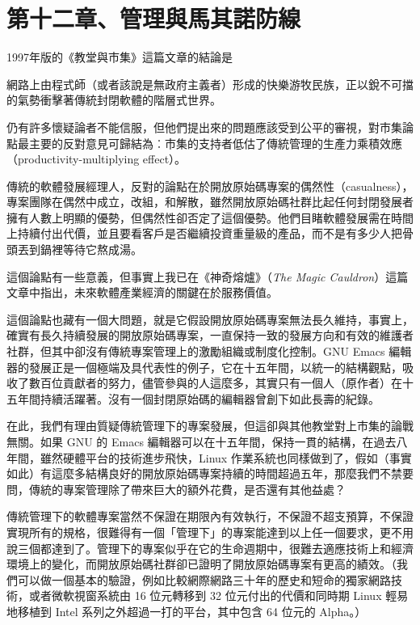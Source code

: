 \documentclass[10pt, b5paper]{book}
\makeatletter
\newcommand*{\shifttext}[2]{%
  \settowidth{\@tempdima}{#2}%
  \makebox[\@tempdima]{\hspace*{#1}#2}%
}
\makeatother
\begin{document}
\newpage
\section{第十二章、管理與馬其諾防線}

1997年版的《教堂與市集》這篇文章的結論是 \shifttext{1pt}{---}\shifttext{-1pt}{---}
網路上由程式師（或者該說是無政府主義者）形成的快樂游牧民族，正以銳不可擋的氣勢衝擊著傳統封閉軟體的階層式世界。

仍有許多懷疑論者不能信服，但他們提出來的問題應該受到公平的審視，對市集論點最主要的反對意見可歸結為︰市集的支持者低估了傳統管理的生產力乘積效應（productivity-multiplying
effect）。

傳統的軟體發展經理人，反對的論點在於開放原始碼專案的偶然性（casualness），專案團隊在偶然中成立，改組，和解散，雖然開放原始碼社群比起任何封閉發展者擁有人數上明顯的優勢，但偶然性卻否定了這個優勢。他們目睹軟體發展需在時間上持續付出代價，並且要看客戶是否繼續投資重量級的產品，而不是有多少人把骨頭丟到鍋裡等待它熬成湯。

這個論點有一些意義，但事實上我已在《神奇熔爐》（\emph{The Magic
Cauldron}）這篇文章中指出，未來軟體產業經濟的關鍵在於服務價值。

這個論點也藏有一個大問題，就是它假設開放原始碼專案無法長久維持，事實上，確實有長久持續發展的開放原始碼專案，一直保持一致的發展方向和有效的維護者社群，但其中卻沒有傳統專案管理上的激勵組織或制度化控制。GNU
Emacs
編輯器的發展正是一個極端及具代表性的例子，它在十五年間，以統一的結構觀點，吸收了數百位貢獻者的努力，儘管參與的人這麼多，其實只有一個人（原作者）在十五年間持續活躍著。沒有一個封閉原始碼的編輯器曾創下如此長壽的紀錄。

在此，我們有理由質疑傳統管理下的專案發展，但這卻與其他教堂對上市集的論戰無關。如果
GNU 的 Emacs
編輯器可以在十五年間，保持一貫的結構，在過去八年間，雖然硬體平台的技術進步飛快，Linux
作業系統也同樣做到了，假如（事實如此）有這麼多結構良好的開放原始碼專案持續的時間超過五年，那麼我們不禁要問，傳統的專案管理除了帶來巨大的額外花費，是否還有其他益處？

傳統管理下的軟體專案當然不保證在期限內有效執行，不保證不超支預算，不保證實現所有的規格，很難得有一個「管理下」的專案能達到以上任一個要求，更不用說三個都達到了。管理下的專案似乎在它的生命週期中，很難去適應技術上和經濟環境上的變化，而開放原始碼社群卻已證明了開放原始碼專案有更高的績效。（我們可以做一個基本的驗證，例如比較網際網路三十年的歷史和短命的獨家網路技術，或者微軟視窗系統由
16 位元轉移到 32 位元付出的代價和同時期 Linux 輕易地移植到 Intel
系列之外超過一打的平台，其中包含 64 位元的 Alpha。）
\end{document}
